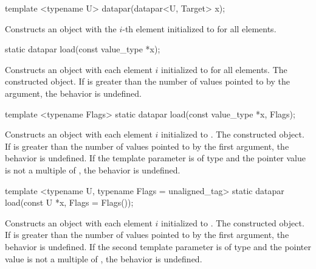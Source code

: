\begin{wgText}
  \begin{itemdecl}
template <typename U> datapar(datapar<U, Target> x);
  \end{itemdecl}
  \begin{itemdescr}
    \pnum
    \effects
    Constructs an object with the $i$-th element initialized to  for all elements.
  \end{itemdescr}

  \begin{itemdecl}
static datapar load(const value_type *x);
  \end{itemdecl}
  \begin{itemdescr}
    \pnum \effects Constructs an object with each element $i$ initialized to  for all elements.
    \pnum \returns The constructed object.
    \pnum \remarks If \datapar{} is greater than the number of values pointed to by the argument, the behavior is undefined.
  \end{itemdescr}

  \begin{itemdecl}
template <typename Flags> static datapar load(const value_type *x, Flags);
  \end{itemdecl}
  \begin{itemdescr}
    \pnum\effects Constructs an object with each element $i$ initialized to .
    \pnum\returns The constructed object.
    \pnum\remarks If \datapar{} is greater than the number of values pointed to by the first argument, the behavior is undefined.
    \pnum         If the template parameter is of type  and the pointer value is not a multiple of , the behavior is undefined.
  \end{itemdescr}

  \begin{itemdecl}
template <typename U, typename Flags = unaligned_tag> static datapar load(const U *x, Flags = Flags());
  \end{itemdecl}
  \begin{itemdescr}
    \pnum\effects Constructs an object with each element $i$ initialized to .
    \pnum\returns The constructed object.
    \pnum\remarks If \datapar{} is greater than the number of values pointed to by the first argument, the behavior is undefined.
    \pnum         If the second template parameter is of type  and the pointer value is not a multiple of , the behavior is undefined.
  \end{itemdescr}


\end{wgText}
